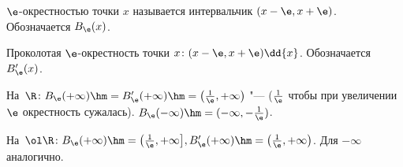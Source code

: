 
    $\e$-окрестностью точки $x$ называется интервальчик $(x-\e,x+\e)$. Обозначается $B_\e(x)$.

    Проколотая $\e$-окрестность точки $x\colon(x-\e,x+\e)\dd\{x\}$. Обозначается $B'_\e(x)$.

    На~$\R\colon B_\e(+\infty)\hm=B'_\e(+\infty)\hm=\big(\frac{1}{\e},+\infty\big)$ "---
    \textup{(}$\frac 1\e$ чтобы при увеличении $\e$ окрестность сужалась\textup{)}. $B_\e(-\infty)\hm=(-\infty,-\frac 1\e)$.

    На~$\ol\R\colon B_\e(+\infty)\hm=\big(\frac{1}{\e},+\infty\big],B'_\e(+\infty)\hm=\big(\frac{1}{\e},+\infty\big)$. Для $-\infty$ аналогично.
